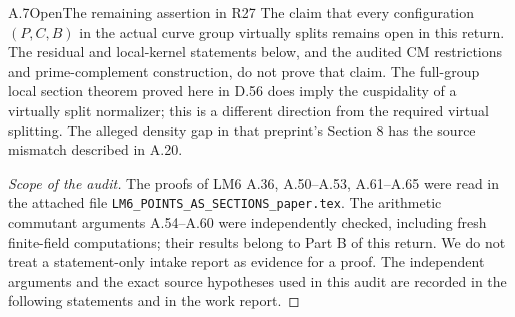 \begin{statement}{A.7}{Open}{The remaining assertion in R27}
The claim that every configuration $(P,C,B)$ in the actual curve
group virtually splits remains open in this return. The residual
and local-kernel statements below, and the audited CM restrictions
and prime-complement construction, do not prove that claim.
The full-group local section theorem proved here in D.56
does imply the cuspidality of a virtually split normalizer; this
is a different direction from the required virtual splitting.
The alleged density gap in that preprint's Section 8 has the
source mismatch described in A.20.
\end{statement}
\begin{proof}[Scope of the audit]
The proofs of LM6 A.36, A.50--A.53, A.61--A.65 were read in the
attached file \texttt{LM6\_POINTS\_AS\_SECTIONS\_paper.tex}.
The arithmetic commutant arguments A.54--A.60 were independently
checked, including fresh finite-field computations; their results
belong to Part B of this return. We do not treat a statement-only
intake report as evidence for a proof. The independent arguments
and the exact source hypotheses used in this audit are recorded
in the following statements and in the work report.
\end{proof}

